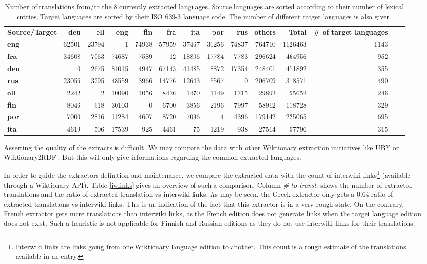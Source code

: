 \documentclass[sw]{iosart2c}
\begin{document}
\begin{table}[htb]
\begin{tabular}{lrrrrrrrrrrrrr}
\textbf{Source/Target}  & \textbf{deu} & \textbf{ell} & \textbf{eng} & \textbf{fin} & \textbf{fra} & \textbf{ita} & \textbf{por} & \textbf{rus}& \textbf{others} & \textbf{Total} & \textbf{\# of target languages}\\
\textbf{eng} & 62501 & 23794 & 1 & 74938 & 57959 & 37467 & 30256 & 74837 & 764710 & 1126463 & 1143\\
\textbf{fra} & 34608 & 7063 & 74687 & 7589 & 12 & 18806 & 17784 & 7783 & 296624 & 464956 & 952\\
\textbf{deu} & 0 & 2675 & 81015 & 4947 & 67143 & 41485 & 8872 & 17354 & 248401 & 471892 & 355\\
\textbf{rus} & 23056 & 3295 & 48559 & 3966 & 14776 & 12643 & 5567 & 0 & 206709 & 318571 & 490\\
\textbf{ell} & 2242 & 2 & 10090 & 1056 & 8436 & 1470 & 1149 & 1315 & 29892 & 55652 & 246\\
\textbf{fin} & 8046 & 918 & 30103 & 0 & 6700 & 3856 & 2196 & 7997 & 58912 & 118728 & 329\\
\textbf{por} & 7000 & 2816 & 11284 & 4607 & 8720 & 7096 & 4 & 4396 & 179142 & 225065 & 695\\
\textbf{ita} & 4619 & 506 & 17539 & 925 & 4461 & 75 & 1219 & 938 & 27514 & 57796 & 315\\
\end{tabular}
\caption{Number of translations from/to the 8 currently extracted languages. Source languages are sorted according to their number of lexical entries. Target languages are sorted by their ISO 639-3 language code. The number of different target languages is also given.}\label{tradsize}
\end{table}

Asserting the quality of the extracts is difficult. We may compare the data with other Wiktionary extraction initiatives like UBY \cite{Zesch08Wikipedia} or Wiktionary2RDF \cite{DBLP:conf/aswc/HellmannBA12}. But this will only give informations regarding the common extracted languages. 

In order to guide the extractors definition and maintenance, we compare the extracted data with the count of interwiki links\footnote{Interwiki links are links going from one Wiktionary language edition to another. This count is a rough estimate of the translations available in an entry.} (available through a Wiktionary API). Table \ref{iwlinks} gives an overview of such a comparison. Column \textit{\# to transl.} shows the number of extracted translations and the ratio of extracted translation vs interwiki links. As may be seen, the Greek extractor only gets a 0.64 ratio of extracted translations vs interwiki links. This is an indication of the fact that this extractor is in a very rough state. On the contrary, French extractor gets more translations than interwiki links, as the French edition does not generate links when the target language edition does not exist. Such a heuristic is not applicable for Finnish and Russian editions as they do not use interwiki links for their translations.
\end{document}
